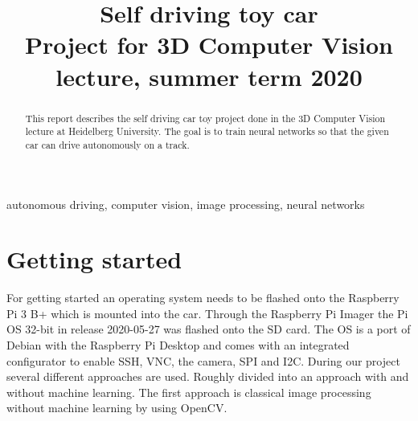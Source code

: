 \documentclass[conference]{IEEEtran}
\begin{document}
\title{Self driving toy car\\
{\footnotesize Project for 3D Computer Vision lecture, summer term 2020}
}

\author{
\and
{}
\and
{}
\and
{}
}

\maketitle

\begin{abstract}
This report describes the self driving car toy project done in the 3D Computer Vision lecture at Heidelberg University.
The goal is to train neural networks so that the given car can drive autonomously on a track.
\end{abstract}

\begin{IEEEkeywords}
autonomous driving, computer vision, image processing, neural networks
\end{IEEEkeywords}

\section{Getting started}
For getting started an operating system needs to be flashed onto the Raspberry Pi 3 B+ which is mounted into the car.
Through the Raspberry Pi Imager the Pi OS 32-bit in release 2020-05-27 was flashed onto the SD card.
The OS is a port of Debian with the Raspberry Pi Desktop and comes with an integrated configurator to enable SSH, VNC, the camera, SPI and I2C.
During our project several different approaches are used.
Roughly divided into an approach with and without machine learning.
The first approach is classical image processing without machine learning by using OpenCV.
\end{document}
